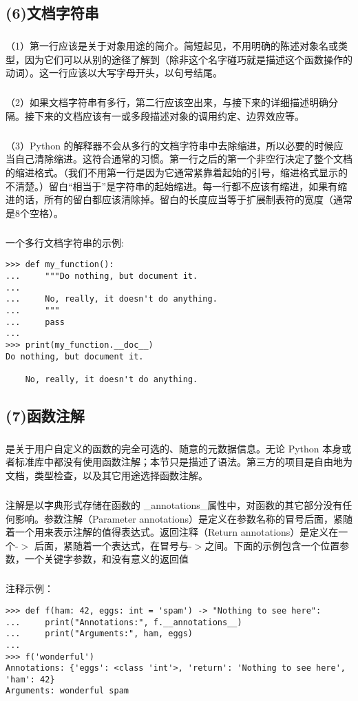\documentclass{article}
\begin{document}
\begin{CJK}{UTF8}{gbsn}
\subsection*{(6)文档字符串}
\subparagraph*{}
（1）第一行应该是关于对象用途的简介。简短起见，不用明确的陈述对象名或类型，因为它们可以从别的途径了解到（除非这个名字碰巧就是描述这个函数操作的动词）。这一行应该以大写字母开头，以句号结尾。
\subparagraph*{}
（2）如果文档字符串有多行，第二行应该空出来，与接下来的详细描述明确分隔。接下来的文档应该有一或多段描述对象的调用约定、边界效应等。
\subparagraph*{}
（3）Python 的解释器不会从多行的文档字符串中去除缩进，所以必要的时候应当自己清除缩进。这符合通常的习惯。第一行之后的第一个非空行决定了整个文档的缩进格式。（我们不用第一行是因为它通常紧靠着起始的引号，缩进格式显示的不清楚。）留白“相当于”是字符串的起始缩进。每一行都不应该有缩进，如果有缩进的话，所有的留白都应该清除掉。留白的长度应当等于扩展制表符的宽度（通常是8个空格）。
\subparagraph*{}
一个多行文档字符串的示例:
\begin{verbatim}
>>> def my_function():
...     """Do nothing, but document it.
...
...     No, really, it doesn't do anything.
...     """
...     pass
...
>>> print(my_function.__doc__)
Do nothing, but document it.

    No, really, it doesn't do anything.
\end{verbatim}
\subsection*{(7)函数注解}
\subparagraph*{}
是关于用户自定义的函数的完全可选的、随意的元数据信息。无论 Python 本身或者标准库中都没有使用函数注解；本节只是描述了语法。第三方的项目是自由地为文档，类型检查，以及其它用途选择函数注解。
\subparagraph*{}
注解是以字典形式存储在函数的 \_{}annotations\_{}属性中，对函数的其它部分没有任何影响。参数注解（Parameter annotations）是定义在参数名称的冒号后面，紧随着一个用来表示注解的值得表达式。返回注释（Return annotations）是定义在一个-$>$ 后面，紧随着一个表达式，在冒号与-$>$之间。下面的示例包含一个位置参数，一个关键字参数，和没有意义的返回值
\subparagraph*{}
注释示例：
\begin{verbatim}
>>> def f(ham: 42, eggs: int = 'spam') -> "Nothing to see here":
...     print("Annotations:", f.__annotations__)
...     print("Arguments:", ham, eggs)
...
>>> f('wonderful')
Annotations: {'eggs': <class 'int'>, 'return': 'Nothing to see here', 'ham': 42}
Arguments: wonderful spam
\end{verbatim}

\end{CJK}
\end{document}
